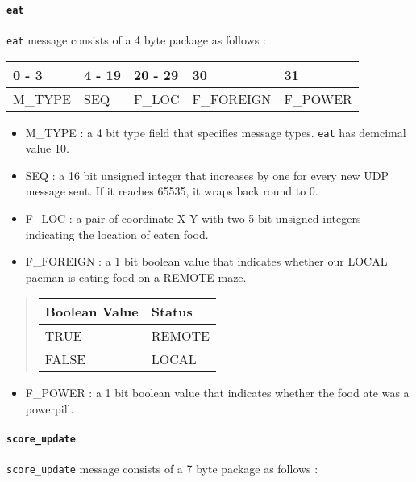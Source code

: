 \documentclass[]{article}
\providecommand{\tightlist}{%
  \setlength{\itemsep}{0pt}\setlength{\parskip}{0pt}}
\let\oldparagraph\paragraph
\renewcommand{\paragraph}[1]{\oldparagraph{#1}\mbox{}}
\begin{document}
\hypertarget{eat}{%
\paragraph{\texorpdfstring{\texttt{eat}}{eat}}\label{eat}}

\texttt{eat} message consists of a 4 byte package as follows :

\begin{longtable}[]{@{}lllll@{}}
\toprule
0 - 3 & 4 - 19 & 20 - 29 & 30 & 31\tabularnewline
\midrule
\endhead
M\_TYPE & SEQ & F\_LOC & F\_FOREIGN & F\_POWER\tabularnewline
\bottomrule
\end{longtable}

\begin{itemize}
\item
  M\_TYPE : a 4 bit type field that specifies message types.
  \texttt{eat} has demcimal value 10.
\item
  SEQ : a 16 bit unsigned integer that increases by one for every new
  UDP message sent. If it reaches 65535, it wraps back round to 0.
\item
  F\_LOC : a pair of coordinate X Y with two 5 bit unsigned integers
  indicating the location of eaten food.
\item
  F\_FOREIGN : a 1 bit boolean value that indicates whether our LOCAL
  pacman is eating food on a REMOTE maze.
\end{itemize}

\begin{quote}
\begin{longtable}[]{@{}ll@{}}
\toprule
Boolean Value & Status\tabularnewline
\midrule
\endhead
TRUE & REMOTE\tabularnewline
FALSE & LOCAL\tabularnewline
\bottomrule
\end{longtable}
\end{quote}

\begin{itemize}
\tightlist
\item
  F\_POWER : a 1 bit boolean value that indicates whether the food ate
  was a powerpill.
\end{itemize}

\hypertarget{score_update}{%
\paragraph{\texorpdfstring{\texttt{score\_update}}{score\_update}}\label{score_update}}

\texttt{score\_update} message consists of a 7 byte package as follows :
\end{document}
